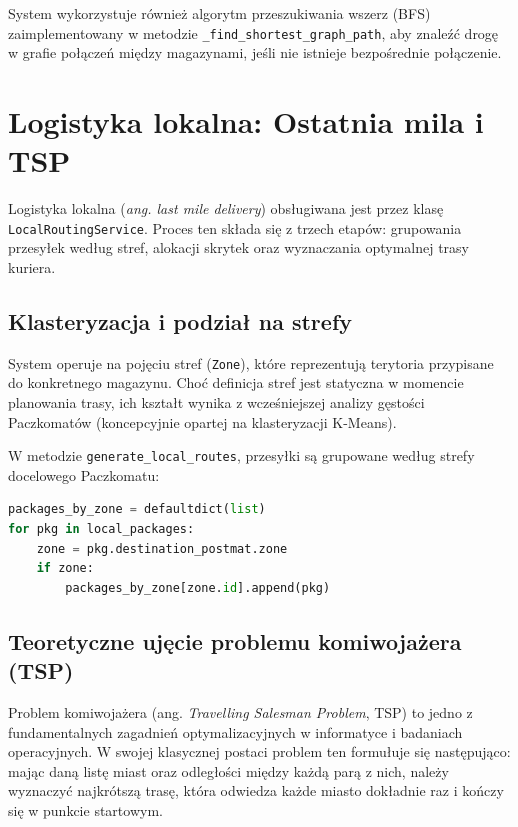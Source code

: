 System wykorzystuje również algorytm przeszukiwania wszerz (BFS) zaimplementowany w metodzie \texttt{\_find\_shortest\_graph\_path}, aby znaleźć drogę w grafie połączeń między magazynami, jeśli nie istnieje bezpośrednie połączenie.

\section{Logistyka lokalna: Ostatnia mila i TSP}

Logistyka lokalna (\textit{ang. last mile delivery}) obsługiwana jest przez klasę \texttt{LocalRoutingService}. Proces ten składa się z trzech etapów: grupowania przesyłek według stref, alokacji skrytek oraz wyznaczania optymalnej trasy kuriera.

\subsection{Klasteryzacja i podział na strefy}

System operuje na pojęciu stref (\texttt{Zone}), które reprezentują terytoria przypisane do konkretnego magazynu. Choć definicja stref jest statyczna w momencie planowania trasy, ich kształt wynika z wcześniejszej analizy gęstości Paczkomatów (koncepcyjnie opartej na klasteryzacji K-Means).

W metodzie \texttt{generate\_local\_routes}, przesyłki są grupowane według strefy docelowego Paczkomatu:

\begin{lstlisting}[language=Python, caption=Grupowanie przesyłek według stref]
packages_by_zone = defaultdict(list)
for pkg in local_packages:
    zone = pkg.destination_postmat.zone
    if zone:
        packages_by_zone[zone.id].append(pkg)
\end{lstlisting}

\subsection{Teoretyczne ujęcie problemu komiwojażera (TSP)}

Problem komiwojażera (ang. \textit{Travelling Salesman Problem}, TSP) to jedno z fundamentalnych zagadnień optymalizacyjnych w informatyce i badaniach operacyjnych. W swojej klasycznej postaci problem ten formułuje się następująco: mając daną listę miast oraz odległości między każdą parą z nich, należy wyznaczyć najkrótszą trasę, która odwiedza każde miasto dokładnie raz i kończy się w punkcie startowym.


